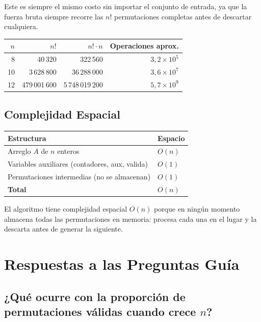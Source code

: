 \documentclass[12pt, a4paper]{article}
\begin{document}
Este es siempre el mismo costo sin importar el conjunto de entrada, ya que la fuerza
bruta siempre recorre las $n!$ permutaciones completas antes de descartar cualquiera.

\begin{center}
\begin{tabular}{rrrr}
\toprule
$n$ & $n!$ & $n! \cdot n$ & Operaciones aprox. \\
\midrule
8  & 40\,320       & 322\,560          & $3{,}2 \times 10^5$ \\
10 & 3\,628\,800   & 36\,288\,000      & $3{,}6 \times 10^7$ \\
12 & 479\,001\,600 & 5\,748\,019\,200  & $5{,}7 \times 10^9$ \\
\bottomrule
\end{tabular}
\end{center}

\subsection{Complejidad Espacial}

\begin{center}
\begin{tabular}{ll}
\toprule
Estructura & Espacio \\
\midrule
Arreglo $A$ de $n$ enteros & $O(n)$ \\
Variables auxiliares (contadores, aux, valida) & $O(1)$ \\
Permutaciones intermedias (no se almacenan) & $O(1)$ \\
\midrule
\textbf{Total} & $O(n)$ \\
\bottomrule
\end{tabular}
\end{center}

El algoritmo tiene complejidad espacial $O(n)$ porque en ningún momento almacena
todas las permutaciones en memoria: procesa cada una en el lugar y la descarta antes
de generar la siguiente.

\section{Respuestas a las Preguntas Guía}

\subsection{¿Qué ocurre con la proporción de permutaciones válidas cuando crece $n$?}
\end{document}
